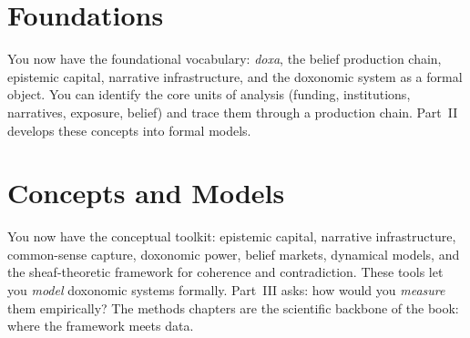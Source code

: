 \documentclass[11pt,a4paper,openright,twoside]{memoir}
\begin{document}
\frontmatter





\cleardoublepage
\tableofcontents

\cleardoublepage


\cleardoublepage


\mainmatter

\part{Foundations}
\label{part:foundations}







\begin{interlude}
You now have the foundational vocabulary: \emph{doxa}, the belief production chain, epistemic capital, narrative infrastructure, and the doxonomic system as a formal object.
You can identify the core units of analysis (funding, institutions, narratives, exposure, belief) and trace them through a production chain.
Part~II develops these concepts into formal models.
\end{interlude}

\part{Concepts and Models}
\label{part:concepts}









\begin{interlude}
You now have the conceptual toolkit: epistemic capital, narrative infrastructure, common-sense capture, doxonomic power, belief markets, dynamical models, and the sheaf-theoretic framework for coherence and contradiction.
These tools let you \emph{model} doxonomic systems formally.
Part~III asks: how would you \emph{measure} them empirically?
The methods chapters are the scientific backbone of the book: where the framework meets data.
\end{interlude}
\end{document}
